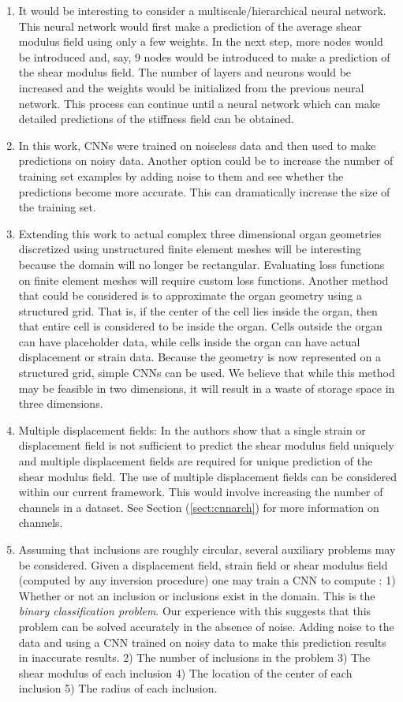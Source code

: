 \documentclass[12pt]{article}
\begin{document}
\begin{enumerate}
\item{It would be interesting to consider a multiscale/hierarchical neural network. This neural network would first make a prediction of the average shear modulus field using only a few weights. In the next step, more nodes would be introduced and, say, 9 nodes would be introduced to make a prediction of the shear modulus field. The number of layers and neurons would be increased and the weights would be initialized from the previous neural network. This process can continue until a neural network which can make detailed predictions of the stiffness field can be obtained.}
\item{In this work, CNNs were trained on noiseless data and then used to make predictions on noisy data. Another option could be to increase the number of training set examples by adding noise to them and see whether the predictions become more accurate. This can dramatically increase the size of the training set.}
\item{Extending this work to actual complex three dimensional organ geometries discretized using unstructured finite element meshes will be interesting because the domain will no longer be rectangular. Evaluating loss functions on finite element meshes will require custom loss functions. Another method that could be considered is to approximate the organ geometry using a structured grid. That is, if the center of the cell lies inside the organ, then that entire cell is considered to be inside the organ. Cells outside the organ can have placeholder data, while cells inside the organ can have actual displacement or strain data. Because the geometry is now represented on a structured grid, simple CNNs can be used. We believe that while this method may be feasible in two dimensions, it will result in a waste of storage space in three dimensions.}
\item{Multiple displacement fields: In \cite{paper:barbonegokhale,paper:barbonebamber} the authors show that a single strain or displacement field is not sufficient to predict the shear modulus field uniquely and multiple displacement fields are required for unique prediction of the shear modulus field. The use of multiple displacement fields can be considered within our current framework. This would involve increasing the number of channels in a dataset. See Section (\ref{sect:cnnarch}) for more information on channels.} 
\item{Assuming that inclusions are roughly circular, several auxiliary problems may be considered. Given a displacement field, strain field or shear modulus field (computed by any inversion procedure) one may train a CNN to compute : 1) Whether or not an inclusion or inclusions exist  in the domain. This is the \textit{binary classification problem}. Our experience with this suggests that this problem can be solved accurately in the absence of noise.  Adding noise to the data and using a CNN trained on noisy data to make this prediction results in inaccurate results. 2) The number of inclusions in the problem 3) The shear modulus of each inclusion 4) The location of the center of each inclusion 5) The radius of each inclusion.}

\end{enumerate}
\end{document}
